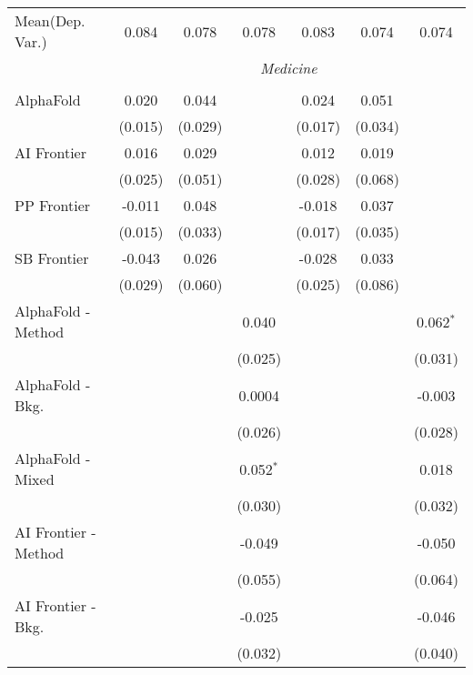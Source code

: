 \begin{tabular}{lcccccc}
Mean(Dep. Var.) & 0.084 & 0.078 & 0.078 & 0.083 & 0.074 & 0.074 \\
 & \multicolumn{6}{c}{\textit{Medicine}} \\ \\
   AlphaFold            & 0.020   & 0.044   &                & 0.024   & 0.051   &   \\   
                        & (0.015) & (0.029) &                & (0.017) & (0.034) &   \\   
   AI Frontier          & 0.016   & 0.029   &                & 0.012   & 0.019   &   \\   
                        & (0.025) & (0.051) &                & (0.028) & (0.068) &   \\   
   PP Frontier          & -0.011  & 0.048   &                & -0.018  & 0.037   &   \\   
                        & (0.015) & (0.033) &                & (0.017) & (0.035) &   \\   
   SB Frontier          & -0.043  & 0.026   &                & -0.028  & 0.033   &   \\   
                        & (0.029) & (0.060) &                & (0.025) & (0.086) &   \\   
   AlphaFold - Method   &         &         & 0.040          &         &         & 0.062$^{*}$\\   
                        &         &         & (0.025)        &         &         & (0.031)\\   
   AlphaFold - Bkg.     &         &         & 0.0004         &         &         & -0.003\\   
                        &         &         & (0.026)        &         &         & (0.028)\\   
   AlphaFold - Mixed    &         &         & 0.052$^{*}$    &         &         & 0.018\\   
                        &         &         & (0.030)        &         &         & (0.032)\\   
   AI Frontier - Method &         &         & -0.049         &         &         & -0.050\\   
                        &         &         & (0.055)        &         &         & (0.064)\\   
   AI Frontier - Bkg.   &         &         & -0.025         &         &         & -0.046\\   
                        &         &         & (0.032)        &         &         & (0.040)\\   

\end{tabular}
